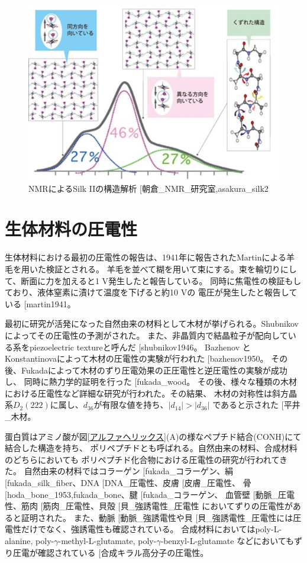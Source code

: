 \documentclass[dvipdfmx,12pt,a4paper]{jreport}
\makeatletter
\DeclareRobustCommand\cite{\unskip
    	\@ifnextchar[{\@tempswatrue\@citex}{\@tempswafalse\@citex[]}}
\makeatother
\begin{document}
		\newpage
		\begin{figure}[h]
			\centering
			\includegraphics[scale=0.3]{NMR_silk_II.jpg}
			\caption{NMRによるSilk IIの構造解析\cite{朝倉_NMR_研究室,asakura_silk2}}
		\end{figure}
		\newpage
		\section{生体材料の圧電性}
			生体材料における最初の圧電性の報告は、1941年に報告されたMartinによる羊毛を用いた検証とされる。
			羊毛を並べて糊を用いて束にする。束を輪切りにして、断面に力を加えると1 V発生したと報告している。
			同時に焦電性の検証もしており、液体窒素に漬けて温度を下げると約10 Vの
			電圧が発生したと報告している\cite{martin1941}。

			最初に研究が活発になった自然由来の材料として木材が挙げられる。Shubnikovによってその圧電性の予測がされた。
			また、非晶質内で結晶粒子が配向している系をpiezoelectric textureと呼んだ\cite{shubnikov1946}。
			Bazhenov と Konstantinovaによって木材の圧電性の実験が行われた\cite{bazhenov1950}。
			その後、Fukadaによって木材のずり圧電効果の正圧電性と逆圧電性の実験が成功し、
			同時に熱力学的証明を行った\cite{fukada_wood}。
			その後、様々な種類の木材における圧電性など詳細な研究が行われた。その結果、
			木材の対称性は斜方晶系$D_2(222)$に属し、$d_{36}$が有限な値を持ち、$|d_{14}|>|d_{36}|$
			であると示された\cite{平井_木材}。

			蛋白質はアミノ酸が図\ref{アルファヘリックス}(A)の様なペプチド結合(CONH)にて結合した構造を持ち、
			ポリペプチドとも呼ばれる。自然由来の材料、合成材料のどちらにおいても
			ポリペプチド化合物における圧電性の研究が行われてきた。
			自然由来の材料ではコラーゲン\cite{fukada_コラーゲン}、絹\cite{fukada_silk_fiber}、DNA\cite{DNA_圧電性}、皮膚\cite{皮膚_圧電性}、
			骨\cite{hoda_bone_1953,fukada_bone}、腱\cite{fukada_コラーゲン}、
			血管壁\cite{動脈_圧電性}、筋肉\cite{筋肉_圧電性}、貝殻\cite{貝_強誘電性_圧電性}
			においてずりの圧電性があると証明された。
			また、動脈\cite{動脈_強誘電性}や貝\cite{貝_強誘電性_圧電性}には圧電性だけでなく、強誘電性も確認されている。
			合成材料においてはpoly-L-alanine, poly-$\gamma$-methyl-L-glutamate, poly-$\gamma$-benzyl-L-glutamate
			などにおいてもずり圧電が確認されている\cite{合成キラル高分子の圧電性}。
\end{document}
